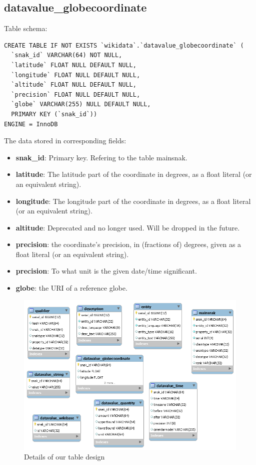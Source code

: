 \documentclass[12pt]{article}
\begin{document}
\subsection{datavalue\_globecoordinate}
\lstset{language=SQL}
Table schema:
\begin{lstlisting}
CREATE TABLE IF NOT EXISTS `wikidata`.`datavalue_globecoordinate` (
  `snak_id` VARCHAR(64) NOT NULL,
  `latitude` FLOAT NULL DEFAULT NULL,
  `longitude` FLOAT NULL DEFAULT NULL,
  `altitude` FLOAT NULL DEFAULT NULL,
  `precision` FLOAT NULL DEFAULT NULL,
  `globe` VARCHAR(255) NULL DEFAULT NULL,
  PRIMARY KEY (`snak_id`))
ENGINE = InnoDB
\end{lstlisting}
The data stored in corresponding fields:
\begin{itemize}
\item \textbf{snak\_id}: Primary key. Refering to the table mainsnak.
\item \textbf{latitude}: The latitude part of the coordinate in degrees, as a float literal (or an equivalent string).
\item \textbf{longitude}: The longitude part of the coordinate in degrees, as a float literal (or an equivalent string).
\item \textbf{altitude}: Deprecated and no longer used. Will be dropped in the future.
\item \textbf{precision}: the coordinate's precision, in (fractions of) degrees, given as a float literal (or an equivalent string).
\item \textbf{precision}: To what unit is the given date/time significant.
\item \textbf{globe}: the URI of a reference globe.
\end{itemize}
\begin{figure}
\centering
\label{fig:2}
\includegraphics[width=0.8\linewidth]{datadetail.png}
\caption{Details of our table design}
\end{figure}
\end{document}

